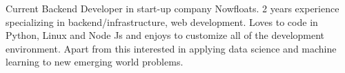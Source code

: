 

\begin{cvparagraph}

Current Backend Developer in start-up company Nowfloats. 2 years experience specializing in backend/infrastructure, web development. Loves to code in Python, Linux and Node Js and enjoys to customize all of the development environment. Apart from this interested in applying data science and machine learning to new emerging world problems. 
\end{cvparagraph}
